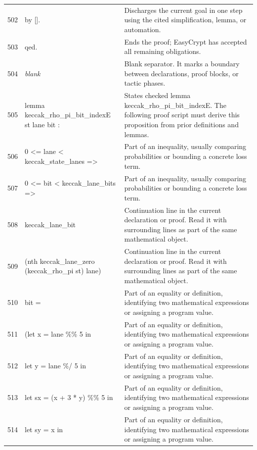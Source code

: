 \documentclass[10pt]{article}
\begin{document}
\begin{longtable}{r L{0.53\textwidth} L{0.37\textwidth}}
502 & {\ttfamily\scriptsize by [].} & Discharges the current goal in one step using the cited simplification, lemma, or automation. \\
503 & {\ttfamily\scriptsize qed.} & Ends the proof; EasyCrypt has accepted all remaining obligations. \\
504 & {\ttfamily\scriptsize \emph{blank}} & Blank separator.  It marks a boundary between declarations, proof blocks, or tactic phases. \\
505 & {\ttfamily\scriptsize lemma keccak\_rho\_pi\_bit\_indexE st lane bit :} & States checked lemma keccak\_rho\_pi\_bit\_indexE.  The following proof script must derive this proposition from prior definitions and lemmas. \\
506 & {\ttfamily\scriptsize   0 <= lane < keccak\_state\_lanes =>} & Part of an inequality, usually comparing probabilities or bounding a concrete loss term. \\
507 & {\ttfamily\scriptsize   0 <= bit < keccak\_lane\_bits =>} & Part of an inequality, usually comparing probabilities or bounding a concrete loss term. \\
508 & {\ttfamily\scriptsize   keccak\_lane\_bit} & Continuation line in the current declaration or proof.  Read it with surrounding lines as part of the same mathematical object. \\
509 & {\ttfamily\scriptsize     (nth keccak\_lane\_zero (keccak\_rho\_pi st) lane)} & Continuation line in the current declaration or proof.  Read it with surrounding lines as part of the same mathematical object. \\
510 & {\ttfamily\scriptsize     bit =} & Part of an equality or definition, identifying two mathematical expressions or assigning a program value. \\
511 & {\ttfamily\scriptsize   (let x = lane \%\% 5 in} & Part of an equality or definition, identifying two mathematical expressions or assigning a program value. \\
512 & {\ttfamily\scriptsize    let y = lane \%/ 5 in} & Part of an equality or definition, identifying two mathematical expressions or assigning a program value. \\
513 & {\ttfamily\scriptsize    let sx = (x + 3 * y) \%\% 5 in} & Part of an equality or definition, identifying two mathematical expressions or assigning a program value. \\
514 & {\ttfamily\scriptsize    let sy = x in} & Part of an equality or definition, identifying two mathematical expressions or assigning a program value. \\

\end{longtable}
\end{document}
